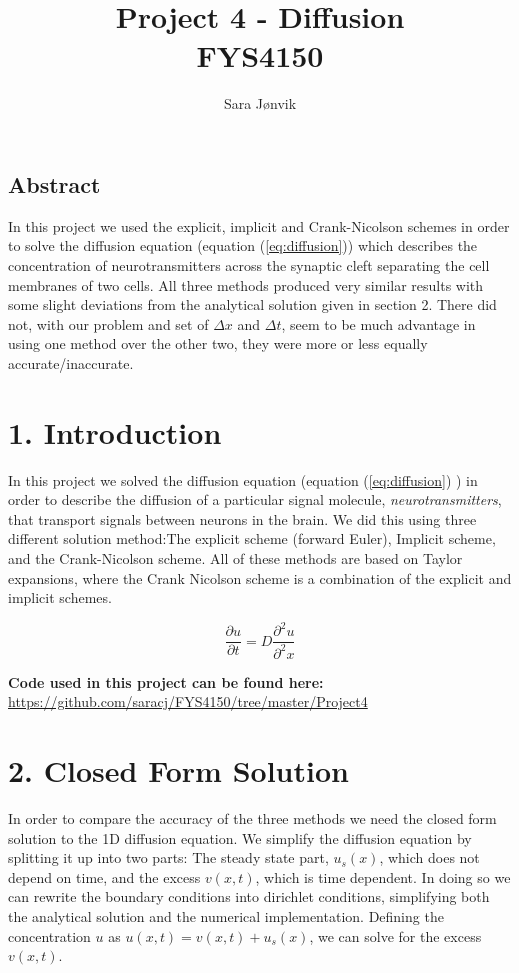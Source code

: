 \documentclass[a4paper,11pt]{report}
\title{Project 4 - Diffusion \\ FYS4150}
\author{Sara J\o nvik}
\begin{document}
\maketitle

\begin{center}
\section*{Abstract}
In this project we used the explicit, implicit and Crank-Nicolson schemes in order to solve the diffusion equation (equation (\ref{eq:diffusion})) which describes the concentration of neurotransmitters across the synaptic cleft separating the cell membranes of two cells. All three methods produced very similar results with some slight deviations from the analytical solution given in section 2. There did not, with our problem and set of \(\Delta x\) and \(\Delta t\), seem to be much advantage in using one method over the other two, they were more or less equally accurate/inaccurate.
\end{center}


\section*{1. Introduction}

In this project we solved the diffusion equation (equation (\ref{eq:diffusion}) ) in order to describe the diffusion of a particular signal molecule, \emph{neurotransmitters}, that transport signals between neurons in the brain. We did this using three different solution method:The explicit scheme (forward Euler), Implicit scheme, and the Crank-Nicolson scheme. All of these methods are based on Taylor expansions, where the Crank Nicolson scheme is a combination of the explicit and implicit schemes. 

\begin{equation}\label{eq:diffusion}
\frac{\partial u}{\partial t} = D \frac{\partial^2 u }{\partial^2 x}
\end{equation}

\textbf{Code used in this project can be found here:} \url{https://github.com/saracj/FYS4150/tree/master/Project4}

\section*{2. Closed Form Solution}

In order to compare the accuracy of the three methods we need the closed form solution to the 1D diffusion equation. We simplify the diffusion equation by splitting it up into two parts: The steady state part, $u_s(x)$, which does not depend on time, and the excess $v(x, t)$, which is time dependent. In doing so we can rewrite the boundary conditions into dirichlet conditions, simplifying both the analytical solution and the numerical implementation. Defining the concentration $u$ as  $u(x, t) = v(x, t) + u_s(x)$, we can solve for the excess $v(x, t)$. 
\end{document}
